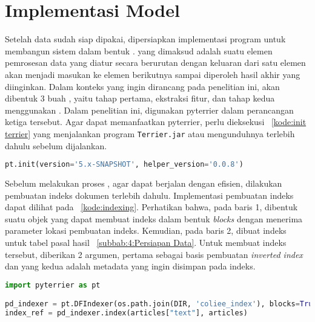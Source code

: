 \section{Implementasi Model}
\label{subbab:4:Implementasi Model}
Setelah data sudah siap dipakai, dipersiapkan implementasi program untuk membangun sistem \ir{} dalam bentuk \pipeline{}. \Pipeline{} yang dimaksud adalah suatu elemen pemrosesan data yang diatur secara berurutan dengan keluaran dari satu elemen akan menjadi masukan ke elemen berikutnya sampai diperoleh hasil akhir yang diinginkan. Dalam konteks \cascaded{} \ir{} yang ingin dirancang pada penelitian ini, akan dibentuk 3 buah \pipeline{}, yaitu \pipeline{} tahap \ranking{} pertama, \pipeline{} ekstraksi fitur, dan \pipeline{} tahap \ranking{} kedua menggunakan \lambdamart{}. Dalam penelitian ini, digunakan \library{} pyterrier dalam perancangan ketiga \pipeline{} tersebut. Agar dapat memanfaatkan pyterrier, perlu dieksekusi \kode{}~\ref{kode:init terrier} yang menjalankan program \lstinline{Terrier.jar} atau mengunduhnya terlebih dahulu sebelum dijalankan.
\begin{lstlisting}[language=Python, caption={Menjalankan program Terrier}, label={kode:init terrier}]
pt.init(version='5.x-SNAPSHOT', helper_version='0.0.8')
\end{lstlisting}

Sebelum melakukan proses \retrieval{}, agar dapat berjalan dengan efisien, dilakukan pembuatan indeks dokumen terlebih dahulu. Implementasi pembuatan indeks dapat dilihat pada \kode{}~\ref{kode:indexing}. Perhatikan bahwa, pada baris 1, dibentuk suatu objek yang dapat membuat indeks dalam bentuk \textit{blocks} dengan menerima parameter lokasi pembuatan indeks. Kemudian, pada baris 2, dibuat indeks untuk tabel pasal hasil \parsing{} \subbab{}~\ref{subbab:4:Persiapan Data}. Untuk membuat indeks tersebut, diberikan 2 argumen, pertama sebagai basis pembuatan \textit{inverted index} dan yang kedua adalah metadata yang ingin disimpan pada indeks.
\begin{lstlisting}[language=Python, caption={Pembentukan indeks}, label={kode:indexing}]
import pyterrier as pt

pd_indexer = pt.DFIndexer(os.path.join(DIR, 'coliee_index'), blocks=True)
index_ref = pd_indexer.index(articles["text"], articles)
\end{lstlisting}

